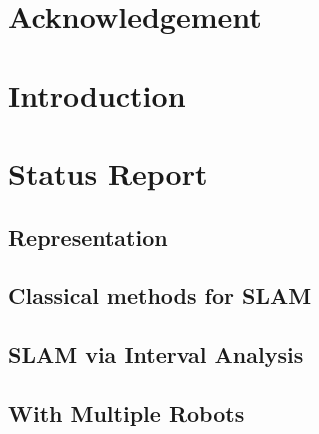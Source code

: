 \documentclass[12pt,fceqn]{report} %
\begin{document}
\renewcommand{\contentsname}{Contents}	%
\renewcommand{\bibname}{Bibliography}	%




\tableofcontents  %
\cleardoublepage  %


\chapter*{Acknowledgement}
\listoffigures  %
\chapter*{Introduction}

\chapter{Status Report}
\section{Representation}

\section{Classical methods for SLAM}

\section{SLAM via Interval Analysis}

\section{With Multiple Robots}

\end{document}
